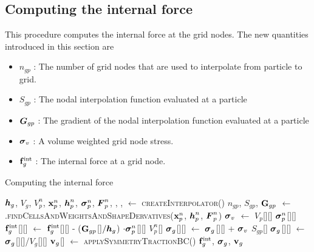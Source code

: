 \subsection{Computing the internal force}
This procedure computes the internal force at the grid nodes. The new quantities introduced in this 
section are
\begin{itemize} 
  \setlength\itemsep{1pt}
  \item $n_{gp}$ : {\Ochre The number of grid nodes that are used to interpolate from particle to grid.}
  \item $S_{gp}$ : {\Ochre The nodal interpolation function evaluated at a particle}
  \item $\boldsymbol{G}_{gp}$ : {\Ochre The gradient of the nodal interpolation function evaluated at a particle}
  \item $\boldsymbol{\sigma}_v$ : {\Ochre A volume weighted grid node stress.}
  \item $\mathbf{f}^{\text{int}}_g$ : {\Ochre The internal force at a grid node.}
\end{itemize}
\begin{breakablealgorithm}
  \caption{Computing the internal force}
  \begin{algorithmic}[1]
    \Require $\boldsymbol{h}_g$, $V_g$, $V_p^n$, $\mathbf{x}_p^n$, $\boldsymbol{h}_p^n$, $\boldsymbol{\sigma}_p^n$, $\boldsymbol{F}_p^n$,
             , , 
      \State {} $\leftarrow$ \textsc{createInterpolator}()
          \State $n_{gp}$, $S_{gp}$, $\mathbf{G}_{gp}$ $\leftarrow$   \WWRP
            .\textsc{findCellsAndWeightsAndShapeDervatives}($\mathbf{x}_p^n$, $\boldsymbol{h}_p^n$, $\boldsymbol{F}_p^n$) \WWRP
          \State $\boldsymbol{\sigma}_v$ $\leftarrow$ $V_p$[\TTmatl][\TTpart] $\boldsymbol{\sigma}_p^n$[\TTmatl][\TTpart] 
            \State $\mathbf{f}^{\text{int}}_g$[\TTmatl][\TTnode] $\leftarrow$ $\mathbf{f}^{\text{int}}_g$[\TTmatl][\TTnode] - 
               ($\mathbf{G}_{gp}$[\TTnode]$/\boldsymbol{h}_g$) $\cdot \boldsymbol{\sigma}_p^n$[\TTmatl][\TTpart] $V_p^n$[\TTpart]
            \State $\boldsymbol{\sigma}_g$[\TTmatl][\TTnode] $\leftarrow$ $\boldsymbol{\sigma}_g$[\TTmatl][\TTnode] + $\boldsymbol{\sigma}_v$ $S_{gp}$[\TTnode]
          \EndFor
        \EndFor
          \State $\boldsymbol{\sigma}_g$[\TTmatl][\TTnode] $\leftarrow$ $\boldsymbol{\sigma}_g$[\TTmatl][\TTnode]/$V_g$[\TTmatl][\TTnode]
        \EndFor
        \State $\mathbf{v}_g$[\TTmatl] $\leftarrow$ \textsc{applySymmetryTractionBC}()
      \EndFor
      \State \Return $\mathbf{f}_g^{\text{int}}$, $\boldsymbol{\sigma}_g$, $\mathbf{v}_g$
    \EndProcedure
  \end{algorithmic}
\end{breakablealgorithm}

